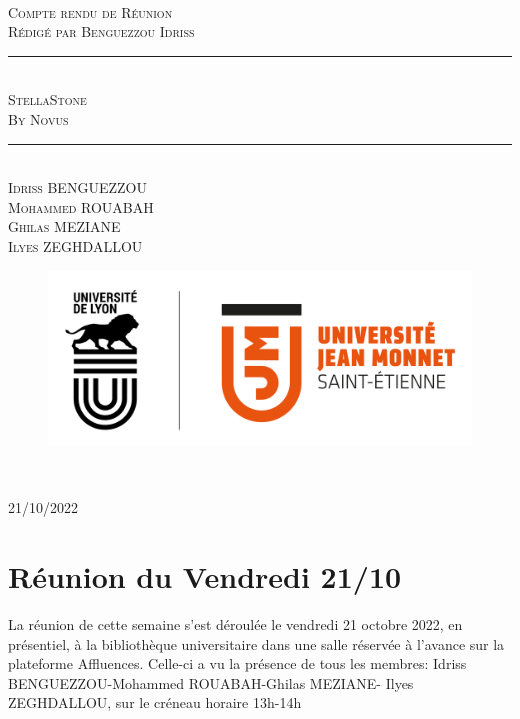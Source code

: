 \documentclass[a4paper, 12pt]{article}
\newcommand{\HRule}{\rule{\linewidth}{0.5mm}}
\begin{document}
\begin{titlepage}
  \begin{sffamily}
  \begin{center}

   
    \textsc{\LARGE }\\[2cm]

    \textsc{\Large Compte rendu de Réunion}\\[1.5cm]
    \textsc{\Medium Rédigé par Benguezzou Idriss}

    \HRule \\[0.4cm]
    { \huge  \textsc{StellaStone} \\
    \textsc{\Large By Novus}\\ [0.4cm] }
	

    \HRule \\[2cm]
    \textsc {Idriss BENGUEZZOU\\Mohammed ROUABAH\\Ghilas MEZIANE \\ Ilyes ZEGHDALLOU}
 \begin{figure}
     \centering
    \includegraphics[scale=0.2]{logoUJM.png}
     \label{fig:ujm_logo}
 \end{figure}
   
    \

    \vfill

    {\large {} 21/10/2022}

  \end{center}
  \end{sffamily}
\end{titlepage}

\newpage

\section{Réunion du Vendredi 21/10}
La réunion de cette semaine s'est déroulée le vendredi 21 octobre 2022, en présentiel, à la bibliothèque universitaire dans une salle réservée à l'avance sur la plateforme Affluences. Celle-ci a vu la présence de tous les membres: Idriss BENGUEZZOU-Mohammed ROUABAH-Ghilas MEZIANE- Ilyes ZEGHDALLOU, sur le créneau horaire 13h-14h \\
\end{document}
